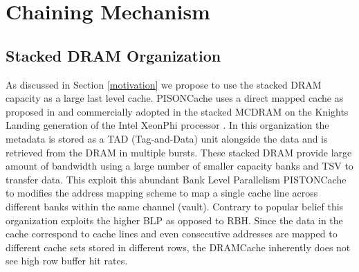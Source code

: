 \section{Chaining Mechanism} \label{mechanism}
\subsection{Stacked DRAM Organization} \label{rbhvblp}
As discussed in Section \ref{motivation} we propose to use the stacked DRAM capacity as a large last level cache. PISONCache uses a direct mapped cache as proposed in \cite{alloy} and commercially adopted in the stacked MCDRAM on the Knights Landing generation of the Intel XeonPhi processor \cite{xeonphi}. In this organization the metadata is stored as a TAD (Tag-and-Data) unit alongside the data and is retrieved from the DRAM in multiple bursts. These stacked DRAM provide large amount of bandwidth using a large number of smaller capacity banks and TSV to transfer data. This exploit this abundant Bank Level Parallelism PISTONCache to modifies the address mapping scheme to map a single cache line across different banks within the same channel (vault). Contrary to popular belief this organization exploits the higher BLP as opposed to RBH. Since the data in the cache correspond to cache lines and even consecutive addresses are mapped to different cache sets stored in different rows, the DRAMCache inherently does not see high row buffer hit rates.